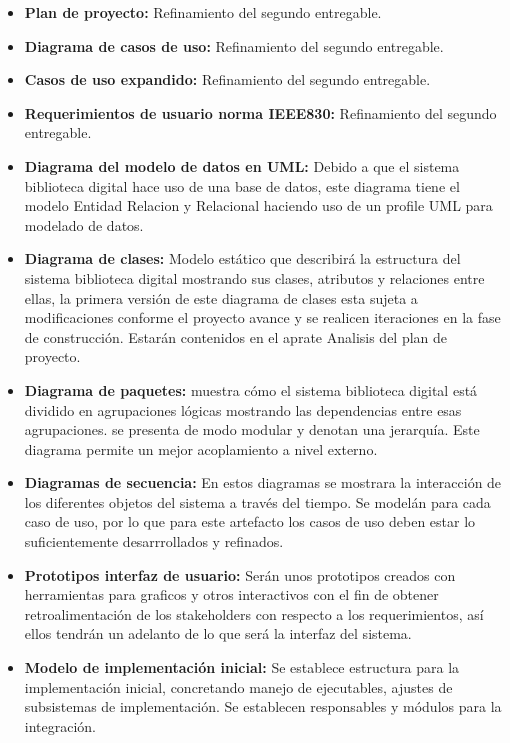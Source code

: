 \documentclass[11pt]{article}
\begin{document}
                \begin{itemize}
                \item\textbf{Plan de proyecto:} Refinamiento del segundo entregable.
                \item\textbf{Diagrama de casos de uso:} Refinamiento del segundo entregable.
                \item\textbf{Casos de uso expandido:} Refinamiento del segundo entregable.
                \item\textbf{Requerimientos de usuario norma IEEE830:} Refinamiento del segundo
                entregable.
                \item\textbf{Diagrama del modelo de datos en UML:} Debido a que el sistema
                biblioteca digital hace uso de una base de datos, este diagrama tiene el modelo
                Entidad Relacion y Relacional haciendo uso de un profile UML para modelado de
                datos.
                \item\textbf{Diagrama de clases:} Modelo estático que describirá la estructura del
                sistema biblioteca digital mostrando sus clases, atributos y relaciones entre
                ellas, la primera versión de este diagrama de clases esta sujeta a modificaciones
                conforme el proyecto avance y se realicen iteraciones en la fase de construcción.
                Estarán contenidos en el aprate Analisis del plan de proyecto.
                \item\textbf{Diagrama de paquetes:} muestra cómo el sistema biblioteca digital está
                dividido en agrupaciones lógicas mostrando las dependencias entre esas
                agrupaciones. se presenta de modo modular y denotan una jerarquía. Este diagrama
                permite un mejor acoplamiento a nivel externo.
                \item\textbf{Diagramas de secuencia:} En estos diagramas se mostrara la interacción
                de los diferentes objetos del sistema a través del tiempo. Se modelán para cada
                caso de uso, por lo que para este artefacto los casos de uso deben estar lo
                suficientemente desarrrollados y refinados.
                \item\textbf{Prototipos interfaz de usuario:} Serán unos prototipos creados con
                herramientas para graficos y otros interactivos con el fin de obtener
                retroalimentación de los stakeholders con respecto a los requerimientos, así ellos
                tendrán un adelanto de lo que será la interfaz del sistema.
                \item\textbf{Modelo de implementación inicial:} Se establece estructura para la
                implementación inicial, concretando manejo de ejecutables, ajustes de subsistemas
                de implementación. Se establecen responsables y módulos para la integración.
                \end{itemize}
                
\end{document}
